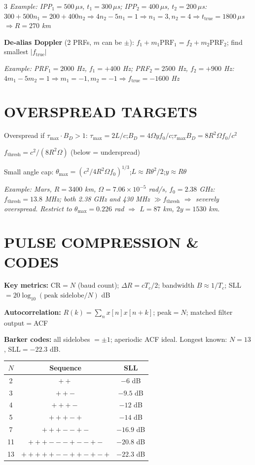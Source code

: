 \documentclass[6pt,landscape]{article}
\begin{document}
\begin{multicols}{3}
\textit{Example: IPP$_1=500\,\mu$s, $t_1=300\,\mu$s; IPP$_2=400\,\mu$s, $t_2=200\,\mu$s: $300+500n_1=200+400n_2\Rightarrow 4n_2-5n_1=1\Rightarrow n_1=3,n_2=4\Rightarrow t_\text{true}=1800\,\mu$s$\Rightarrow R=270$ km}

\textbf{De-alias Doppler} (2 PRFs, $m$ can be $\pm$):
$f_1+m_1\text{PRF}_1=f_2+m_2\text{PRF}_2$; find smallest $|f_\text{true}|$

\textit{Example: PRF$_1=2000$ Hz, $f_1=+400$ Hz; PRF$_2=2500$ Hz, $f_2=+900$ Hz: $4m_1-5m_2=1\Rightarrow m_1=-1,m_2=-1\Rightarrow f_\text{true}=-1600$ Hz}

\section*{OVERSPREAD TARGETS}
Overspread if $\tau_\text{max}\cdot B_D>1$:
$\tau_\text{max}=2L/c$;\quad$B_D=4\Omega y f_0/c$;\quad$\tau_\text{max}B_D=8R^2\Omega f_0/c^2$

$f_\text{thresh}=c^2/(8R^2\Omega)$ (below = underspread)

Small angle cap: $\theta_\text{max}=(c^2/4R^2\Omega f_0)^{1/3}$;\quad $L\approx R\theta^2/2$;\quad $y\approx R\theta$

\textit{Example: Mars, $R=3400$ km, $\Omega=7.06\times10^{-5}$ rad/s, $f_0=2.38$ GHz: $f_\text{thresh}=13.8$ MHz; both 2.38 GHz and 430 MHz $\gg f_\text{thresh}$ $\Rightarrow$ severely overspread. Restrict to $\theta_\text{max}=0.226$ rad $\Rightarrow$ $L=87$ km, $2y=1530$ km.}

\section*{PULSE COMPRESSION \& CODES}
\textbf{Key metrics:} CR$=N$ (baud count); $\Delta R=cT_c/2$; bandwidth $B\approx1/T_c$; SLL$=20\log_{10}(\text{peak sidelobe}/N)$ dB

\textbf{Autocorrelation:} $R(k)=\sum_n x[n]x[n+k]$; peak$=N$; matched filter output$=$ACF

\textbf{Barker codes:} all sidelobes $=\pm1$; aperiodic ACF ideal. Longest known: $N=13$, SLL$=-22.3$ dB.

\begin{center}\begin{tabular}{ccc}
\toprule$N$&Sequence&SLL\\\midrule
2&$++$&$-6$ dB\\3&$++-$&$-9.5$ dB\\4&$+++-$&$-12$ dB\\5&$+++-+$&$-14$ dB\\7&$+++--+-$&$-16.9$ dB\\11&$+++---+--+-$&$-20.8$ dB\\13&$+++++--++-+-+$&$-22.3$ dB\\\bottomrule
\end{tabular}\end{center}


\end{multicols}
\end{document}

